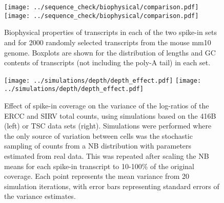 \documentclass{article}
\begin{document}
\begin{figure}[btp]
    \begin{center}
        \texttt{[image: ../sequence\_check/biophysical/comparison.pdf]}
        \texttt{[image: ../sequence\_check/biophysical/comparison.pdf]}
    \end{center}
    \caption{Biophysical properties of transcripts in each of the two spike-in sets and for 2000 randomly selected transcripts from the mouse mm10 genome.
    Boxplots are shown for the distribution of lengths and GC contents of transcripts (not including the poly-A tail) in each set.
}
\end{figure}

\begin{figure}[btp]
    \begin{center}
        \texttt{[image: ../simulations/depth/depth\_effect.pdf]}
        \texttt{[image: ../simulations/depth/depth\_effect.pdf]}
    \end{center}
    \caption{Effect of spike-in coverage on the variance of the log-ratios of the ERCC and SIRV total counts, using simulations based on the 416B (left) or TSC data sets (right).
        Simulations were performed where the only source of variation between cells was the stochastic sampling of counts from a NB distribution with parameters estimated from real data.
        This was repeated after scaling the NB means for each spike-in transcript to 10-100\% of the original coverage. 
        Each point represents the mean variance from 20 simulation iterations, with error bars representing standard errors of the variance estimates.
    }
    \label{fig:sampledepth}
\end{figure}
\end{document}
